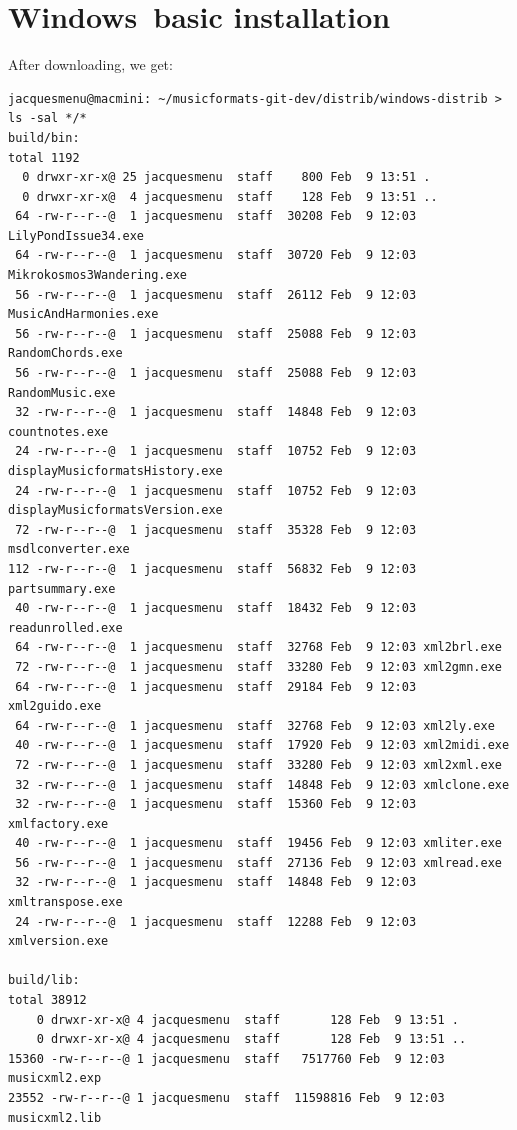 \section{Windows\texttrademark\ basic installation}

After downloading, we get:
\begin{lstlisting}[language=Terminal]
jacquesmenu@macmini: ~/musicformats-git-dev/distrib/windows-distrib > ls -sal */*
build/bin:
total 1192
  0 drwxr-xr-x@ 25 jacquesmenu  staff    800 Feb  9 13:51 .
  0 drwxr-xr-x@  4 jacquesmenu  staff    128 Feb  9 13:51 ..
 64 -rw-r--r--@  1 jacquesmenu  staff  30208 Feb  9 12:03 LilyPondIssue34.exe
 64 -rw-r--r--@  1 jacquesmenu  staff  30720 Feb  9 12:03 Mikrokosmos3Wandering.exe
 56 -rw-r--r--@  1 jacquesmenu  staff  26112 Feb  9 12:03 MusicAndHarmonies.exe
 56 -rw-r--r--@  1 jacquesmenu  staff  25088 Feb  9 12:03 RandomChords.exe
 56 -rw-r--r--@  1 jacquesmenu  staff  25088 Feb  9 12:03 RandomMusic.exe
 32 -rw-r--r--@  1 jacquesmenu  staff  14848 Feb  9 12:03 countnotes.exe
 24 -rw-r--r--@  1 jacquesmenu  staff  10752 Feb  9 12:03 displayMusicformatsHistory.exe
 24 -rw-r--r--@  1 jacquesmenu  staff  10752 Feb  9 12:03 displayMusicformatsVersion.exe
 72 -rw-r--r--@  1 jacquesmenu  staff  35328 Feb  9 12:03 msdlconverter.exe
112 -rw-r--r--@  1 jacquesmenu  staff  56832 Feb  9 12:03 partsummary.exe
 40 -rw-r--r--@  1 jacquesmenu  staff  18432 Feb  9 12:03 readunrolled.exe
 64 -rw-r--r--@  1 jacquesmenu  staff  32768 Feb  9 12:03 xml2brl.exe
 72 -rw-r--r--@  1 jacquesmenu  staff  33280 Feb  9 12:03 xml2gmn.exe
 64 -rw-r--r--@  1 jacquesmenu  staff  29184 Feb  9 12:03 xml2guido.exe
 64 -rw-r--r--@  1 jacquesmenu  staff  32768 Feb  9 12:03 xml2ly.exe
 40 -rw-r--r--@  1 jacquesmenu  staff  17920 Feb  9 12:03 xml2midi.exe
 72 -rw-r--r--@  1 jacquesmenu  staff  33280 Feb  9 12:03 xml2xml.exe
 32 -rw-r--r--@  1 jacquesmenu  staff  14848 Feb  9 12:03 xmlclone.exe
 32 -rw-r--r--@  1 jacquesmenu  staff  15360 Feb  9 12:03 xmlfactory.exe
 40 -rw-r--r--@  1 jacquesmenu  staff  19456 Feb  9 12:03 xmliter.exe
 56 -rw-r--r--@  1 jacquesmenu  staff  27136 Feb  9 12:03 xmlread.exe
 32 -rw-r--r--@  1 jacquesmenu  staff  14848 Feb  9 12:03 xmltranspose.exe
 24 -rw-r--r--@  1 jacquesmenu  staff  12288 Feb  9 12:03 xmlversion.exe

build/lib:
total 38912
    0 drwxr-xr-x@ 4 jacquesmenu  staff       128 Feb  9 13:51 .
    0 drwxr-xr-x@ 4 jacquesmenu  staff       128 Feb  9 13:51 ..
15360 -rw-r--r--@ 1 jacquesmenu  staff   7517760 Feb  9 12:03 musicxml2.exp
23552 -rw-r--r--@ 1 jacquesmenu  staff  11598816 Feb  9 12:03 musicxml2.lib


\end{lstlisting}
